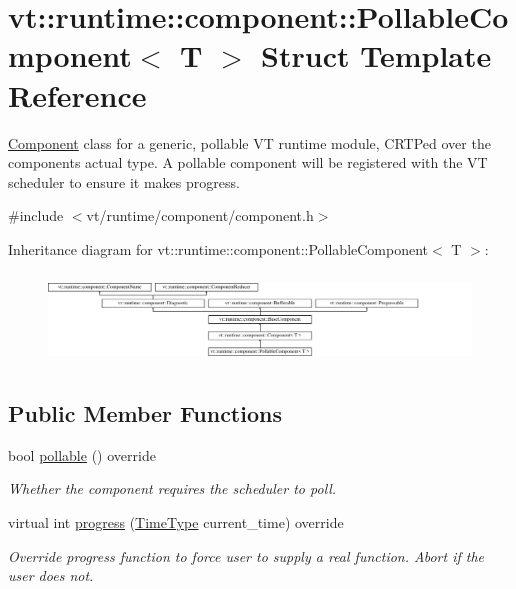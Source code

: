\hypertarget{structvt_1_1runtime_1_1component_1_1_pollable_component}{}\section{vt\+:\+:runtime\+:\+:component\+:\+:Pollable\+Component$<$ T $>$ Struct Template Reference}
\label{structvt_1_1runtime_1_1component_1_1_pollable_component}


{\ttfamily \hyperlink{structvt_1_1runtime_1_1component_1_1_component}{Component}} class for a generic, pollable VT runtime module, C\+R\+TP\textquotesingle{}ed over the component\textquotesingle{}s actual type. A pollable component will be registered with the VT scheduler to ensure it makes progress.  




{\ttfamily \#include $<$vt/runtime/component/component.\+h$>$}

Inheritance diagram for vt\+:\+:runtime\+:\+:component\+:\+:Pollable\+Component$<$ T $>$\+:\begin{figure}[H]
\begin{center}
\leavevmode
\includegraphics[height=2.422145cm]{structvt_1_1runtime_1_1component_1_1_pollable_component}
\end{center}
\end{figure}
\subsection*{Public Member Functions}
\begin{DoxyCompactItemize}
\item 
bool \hyperlink{structvt_1_1runtime_1_1component_1_1_pollable_component_a8ad6cfbc184ed9862cae5304605fe025}{pollable} () override
\begin{DoxyCompactList}\small\item\em Whether the component requires the scheduler to poll. \end{DoxyCompactList}\item 
virtual int \hyperlink{structvt_1_1runtime_1_1component_1_1_pollable_component_a51939e8b7e895a377c10c6767034396b}{progress} (\hyperlink{namespacevt_a2b9f28078dc309ad0706b69ded743e69}{Time\+Type} current\+\_\+time) override
\begin{DoxyCompactList}\small\item\em Override progress function to force user to supply a real function. Abort if the user does not. \end{DoxyCompactList}\end{DoxyCompactItemize}
